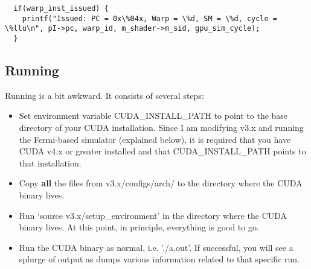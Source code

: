 \documentclass{article}
\begin{document}
\begin{lstlisting}
  if(warp_inst_issued) {
    printf("Issued: PC = 0x\%04x, Warp = \%d, SM = \%d, cycle = \%llu\n", pI->pc, warp_id, m_shader->m_sid, gpu_sim_cycle);
  }
\end{lstlisting}       

\subsection{Running}

Running \gpusim is a bit awkward. It consists of several steps:

\begin{itemize}
  \item Set environment variable CUDA\_INSTALL\_PATH to point to the base directory of your CUDA installation.
   Since I am modifying v3.x and running the Fermi-based simulator (explained below), it is required
   that you have CUDA v4.x or greater installed and that CUDA\_INSTALL\_PATH points to that installation. 

  \item Copy \textbf{all} the files from v3.x/configs/arch/ to the directory where the CUDA binary lives. 

  \item Run `source v3.x/setup\_environment' in the directory where the CUDA binary lives. At this point, in principle,
  everything is good to go.

  \item Run the CUDA binary as normal, i.e. './a.out'. If successful, you will see a splurge of output as \gpusim dumps
  various information related to that specific run.
\end{itemize}
\end{document}

